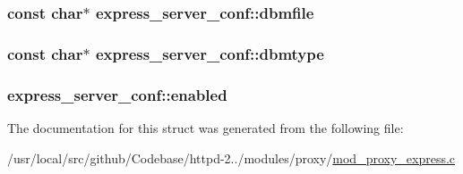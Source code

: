 \subsubsection[{\texorpdfstring{dbmfile}{dbmfile}}]{\setlength{\rightskip}{0pt plus 5cm}const char$\ast$ express\+\_\+server\+\_\+conf\+::dbmfile}\hypertarget{structexpress__server__conf_a6032305f736907b56d36cef87db556fe}{}\label{structexpress__server__conf_a6032305f736907b56d36cef87db556fe}
\subsubsection[{\texorpdfstring{dbmtype}{dbmtype}}]{\setlength{\rightskip}{0pt plus 5cm}const char$\ast$ express\+\_\+server\+\_\+conf\+::dbmtype}\hypertarget{structexpress__server__conf_a397473336dc8845f24e18a4b600194cf}{}\label{structexpress__server__conf_a397473336dc8845f24e18a4b600194cf}
\subsubsection[{\texorpdfstring{enabled}{enabled}}]{ express\+\_\+server\+\_\+conf\+::enabled}\hypertarget{structexpress__server__conf_a50d47baa75c991e4df686d0b840eadfc}{}\label{structexpress__server__conf_a50d47baa75c991e4df686d0b840eadfc}


The documentation for this struct was generated from the following file\+:\begin{DoxyCompactItemize}
\item 
/usr/local/src/github/\+Codebase/httpd-\/2../modules/proxy/\hyperlink{mod__proxy__express_8c}{mod\+\_\+proxy\+\_\+express.\+c}\end{DoxyCompactItemize}
